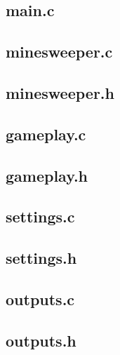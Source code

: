 \documentclass{article}
\begin{document}
    \subsection{main.c}
        

    \subsection{minesweeper.c}
        

    \subsection{minesweeper.h}
        

    \subsection{gameplay.c}
        

    \subsection{gameplay.h}
        

    \subsection{settings.c}
        

    \subsection{settings.h}
        

    \subsection{outputs.c}
        

    \subsection{outputs.h}
        
\end{document}
